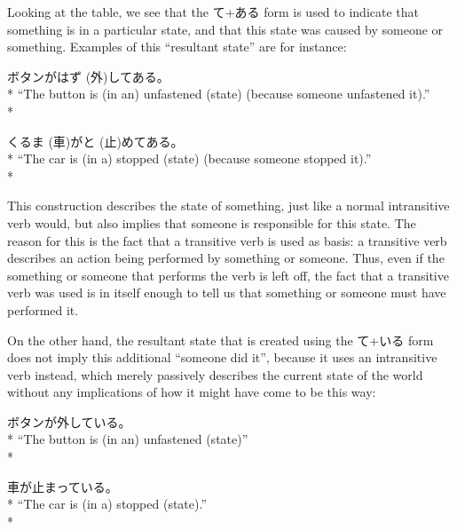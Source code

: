 \documentclass[11pt, b5paper, twoside, openright, onecolumn]{book}
\makeatletter
\newcommand*{\rubystack}[2]{{\relscale{0.5}%
  \begin{tabular}[b]{@{}c@{}}%
    {#1}\\%
   {\textscale{2}{#2}}%
  \end{tabular}}%
}
\DeclareRobustCommand*{\ruby}[2]{%
  \mbox{%
    \setlength{\parskip}{0ex}%
    \BeginAccSupp{method=pdfstringdef,ActualText={#1}}%
      \rubystack{\phantom{#2}}{#1}%
      \llap{%
        \rubystack{#2}{\phantom{#1}}%
      }%
    \EndAccSupp{}%
  }%
}
\renewcommand*{\ruby}[2]{#2 (#1)}%
\newenvironment{exampleblock}{
\setlength{\parindent}{0.6in}
\begin{minipage}[t]{\dimexpr\textwidth-\parindent}}
{\end{minipage}}
\makeatother
\begin{document}
Looking at the table‚ we see that the て+ある form is used to indicate that something is in a particular state‚ and that this state was caused by someone or something. Examples of this “resultant state” are for instance:

\vspace{0.4cm}
\begin{exampleblock}
ボタンが\ruby{外}{はず}してある。 \\* 
“The button is (in an) unfastened (state) (because someone unfastened it).” \\* 
\end{exampleblock}
\vspace{0.2cm}

\begin{exampleblock}
\ruby{車}{くるま}が\ruby{止}{と}めてある。 \\* 
“The car is (in a) stopped (state) (because someone stopped it).” \\* 
\end{exampleblock}
\vspace{0.2cm}

This construction describes the state of something‚ just like a normal intransitive verb would‚ but also implies that someone is responsible for this state. The reason for this is the fact that a transitive verb is used as basis: a transitive verb describes an action being performed by something or someone. Thus‚ even if the something or someone that performs the verb is left off‚ the fact that a transitive verb was used is in itself enough to tell us that something or someone must have performed it.

On the other hand‚ the resultant state that is created using the て+いる form does not imply this additional “someone did it”‚ because it uses an intransitive verb instead‚ which merely passively describes the current state of the world without any implications of how it might have come to be this way:

\vspace{0.4cm}
\begin{exampleblock}
ボタンが外している。 \\* 
“The button is (in an) unfastened (state)” \\* 
\end{exampleblock}
\vspace{0.2cm}

\begin{exampleblock}
車が止まっている。 \\* 
“The car is (in a) stopped (state).” \\* 
\end{exampleblock}
\vspace{0.2cm}
\end{document}
